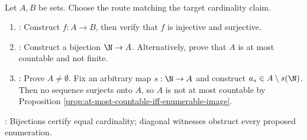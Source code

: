 \begin{samepage}
\begin{proofmethod} \label{meth:cardinality-proof-patterns} \\
Let $A,B$ be sets. Choose the route matching the target cardinality claim.
\begin{enumerate}[label=(\roman*)]
\setlength{\itemsep}{0pt}
\item {}: Construct $f:A\to B$, then verify that $f$ is injective and surjective.
\item {}: Construct a bijection $\N\to A$. Alternatively, prove that $A$ is at most countable and not finite.
\item {}: Prove $A\neq\emptyset$. Fix an arbitrary map $s:\N\to A$ and construct $a_s\in A\setminus s(\N)$.\\
Then no sequence surjects onto $A$, so $A$ is not at most countable by Proposition \ref{prop:at-most-countable-iff-enumerable-image}.
\end{enumerate}
: Bijections certify equal cardinality; diagonal witnesses obstruct every proposed enumeration.
\end{proofmethod}
\end{samepage}

